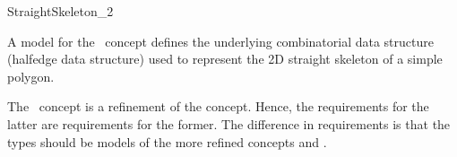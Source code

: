 
\ccRefPageBegin


\begin{ccRefConcept}{StraightSkeleton_2}

   A model for the \ccRefName\ concept defines the underlying
   combinatorial data structure (halfedge data structure) used to
   represent the 2D straight skeleton of a simple polygon.

The \ccRefName\ concept is a refinement of the  concept. Hence, the requirements for the latter are requirements for the former.
The difference in requirements is that the
types should be models of the more refined concepts
 and .

\ccTypes



\end{ccRefConcept} %
\ccRefPageEnd
